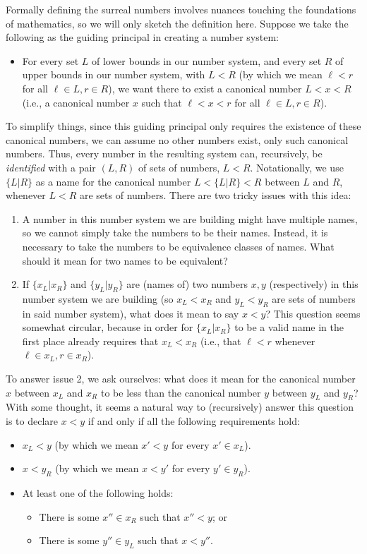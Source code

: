 \documentclass[twoside,11pt]{article}
\begin{document}
Formally defining the surreal numbers involves nuances touching the foundations
of mathematics, so we will only sketch the definition here.
Suppose we take the following as the guiding principal in creating a number system:
\begin{itemize}
    \item
    For every set $L$ of lower bounds in our number system, and every set $R$ of
    upper bounds in our number system, with $L<R$ (by which we mean $\ell<r$
    for all $\ell\in L, r\in R$), we want there to exist a canonical number
    $L<x<R$ (i.e., a canonical number $x$ such that $\ell<x<r$ for all
    $\ell\in L, r\in R$).
\end{itemize}
To simplify things, since this guiding principal only requires the existence of
these canonical numbers, we can assume no other numbers exist, only such canonical
numbers. Thus, every number in the resulting system can, recursively, be
\emph{identified} with a pair $(L,R)$ of sets of numbers, $L<R$. Notationally,
we use $\{L|R\}$ as a name for the canonical number $L<\{L|R\}<R$ between $L$ and $R$,
whenever $L<R$ are sets of numbers. There are two tricky issues with this idea:
\begin{enumerate}
    \item
    A number in this number system we are building might have multiple names,
    so we cannot simply take the numbers to be their names. Instead, it is necessary
    to take the numbers to be equivalence classes of names.
    What should it mean for two names to be equivalent?
    \item
    If $\{x_L|x_R\}$ and $\{y_L|y_R\}$ are (names of) two numbers $x,y$ (respectively)
    in this number system we are building
    (so $x_L<x_R$ and $y_L<y_R$ are sets of numbers in said number system),
    what does it mean to say $x<y$? This question seems
    somewhat circular, because in order for $\{x_L|x_R\}$ to be a valid name in the
    first place already requires that $x_L<x_R$ (i.e., that $\ell<r$ whenever
    $\ell\in x_L,r\in x_R$).
\end{enumerate}
To answer issue 2, we ask ourselves: what does it mean for the canonical number
$x$ between $x_L$ and $x_R$ to be less than the canonical number $y$ between $y_L$ and $y_R$?
With some thought, it seems a natural way to (recursively)
answer this question is to declare $x<y$ if
and only if all the following requirements hold:
\begin{itemize}
    \item
    $x_L<y$ (by which we mean $x'<y$ for every $x'\in x_L$).
    \item
    $x<y_R$ (by which we mean $x<y'$ for every $y'\in y_R$).
    \item
    At least one of the following holds:
    \begin{itemize}
        \item
        There is some $x''\in x_R$ such that $x''<y$; or
        \item
        There is some $y''\in y_L$ such that $x<y''$.
    \end{itemize}
\end{itemize}
\end{document}
